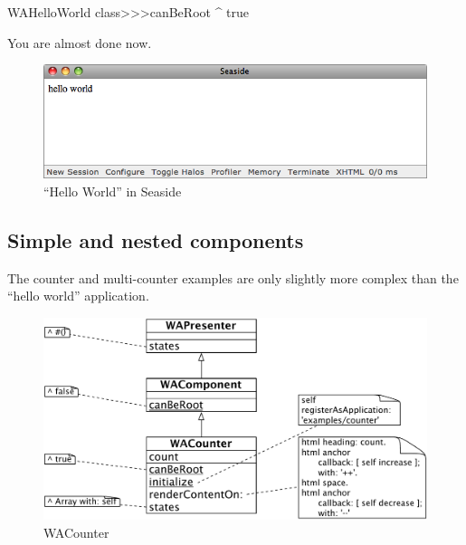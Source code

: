 \documentclass[a4paper,10pt,twoside]{book}
\begin{document}
\begin{code}{}
WAHelloWorld class>>>canBeRoot
	^ true
\end{code}

You are almost done now.


\begin{figure}[ht]
\begin{center}
\includegraphics[width=\textwidth]{WAHelloWorld}
\caption{``Hello World'' in Seaside}
\label{fig:WAHelloWorld}
\end{center}
\end{figure}

\subsection{Simple and nested components}

The counter and multi-counter examples are only slightly more complex than the ``hello world'' application.

\begin{figure}[ht]
\begin{center}
\includegraphics[width=\textwidth]{WACounter}
\caption{WACounter}
\label{fig:WACounter}
\end{center}
\end{figure}
\end{document}
